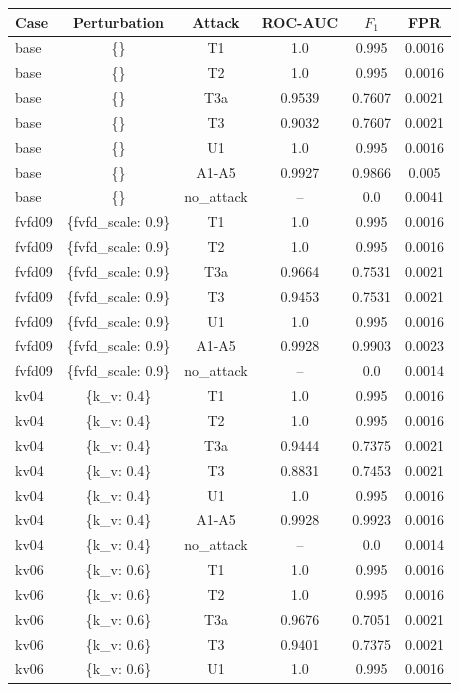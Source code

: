 \begin{tabular}{lccccc}
\hline
Case & Perturbation & Attack & ROC-AUC & $F_1$ & FPR \\
\hline
base & \{\} & T1 & 1.0 & 0.995 & 0.0016 \\
base & \{\} & T2 & 1.0 & 0.995 & 0.0016 \\
base & \{\} & T3a & 0.9539 & 0.7607 & 0.0021 \\
base & \{\} & T3 & 0.9032 & 0.7607 & 0.0021 \\
base & \{\} & U1 & 1.0 & 0.995 & 0.0016 \\
base & \{\} & A1-A5 & 0.9927 & 0.9866 & 0.005 \\
base & \{\} & no\_attack & -- & 0.0 & 0.0041 \\
fvfd09 & \{fvfd\_scale: 0.9\} & T1 & 1.0 & 0.995 & 0.0016 \\
fvfd09 & \{fvfd\_scale: 0.9\} & T2 & 1.0 & 0.995 & 0.0016 \\
fvfd09 & \{fvfd\_scale: 0.9\} & T3a & 0.9664 & 0.7531 & 0.0021 \\
fvfd09 & \{fvfd\_scale: 0.9\} & T3 & 0.9453 & 0.7531 & 0.0021 \\
fvfd09 & \{fvfd\_scale: 0.9\} & U1 & 1.0 & 0.995 & 0.0016 \\
fvfd09 & \{fvfd\_scale: 0.9\} & A1-A5 & 0.9928 & 0.9903 & 0.0023 \\
fvfd09 & \{fvfd\_scale: 0.9\} & no\_attack & -- & 0.0 & 0.0014 \\
kv04 & \{k\_v: 0.4\} & T1 & 1.0 & 0.995 & 0.0016 \\
kv04 & \{k\_v: 0.4\} & T2 & 1.0 & 0.995 & 0.0016 \\
kv04 & \{k\_v: 0.4\} & T3a & 0.9444 & 0.7375 & 0.0021 \\
kv04 & \{k\_v: 0.4\} & T3 & 0.8831 & 0.7453 & 0.0021 \\
kv04 & \{k\_v: 0.4\} & U1 & 1.0 & 0.995 & 0.0016 \\
kv04 & \{k\_v: 0.4\} & A1-A5 & 0.9928 & 0.9923 & 0.0016 \\
kv04 & \{k\_v: 0.4\} & no\_attack & -- & 0.0 & 0.0014 \\
kv06 & \{k\_v: 0.6\} & T1 & 1.0 & 0.995 & 0.0016 \\
kv06 & \{k\_v: 0.6\} & T2 & 1.0 & 0.995 & 0.0016 \\
kv06 & \{k\_v: 0.6\} & T3a & 0.9676 & 0.7051 & 0.0021 \\
kv06 & \{k\_v: 0.6\} & T3 & 0.9401 & 0.7375 & 0.0021 \\
kv06 & \{k\_v: 0.6\} & U1 & 1.0 & 0.995 & 0.0016 \\

\end{tabular}
